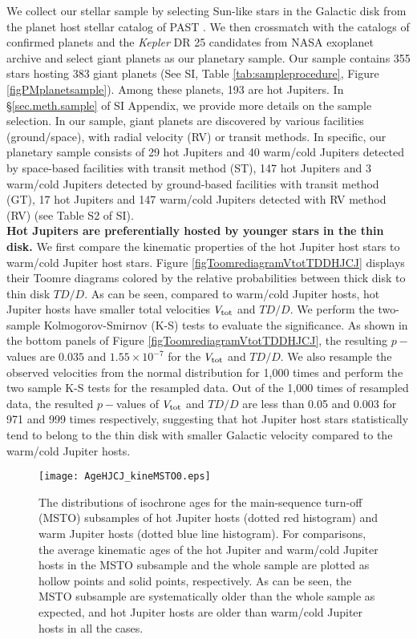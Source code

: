 \documentclass[twocolumn]{pnas-new}
\begin{document}
We collect our stellar sample by selecting Sun-like stars in the Galactic disk from the planet host stellar catalog of PAST \uppercase\expandafter{} \citep{2021ApJ...909..115C}.
We then crossmatch with the catalogs of confirmed planets and the {\it Kepler} DR 25 candidates from NASA exoplanet archive \citep[https://exoplanetarchive.ipac.caltech.edu;][]{2013PASP..125..989A} and select giant planets as our planetary sample.
Our sample contains 355 stars hosting 383 giant planets (See SI, Table \ref{tab:sampleprocedure}, Figure \ref{figPMplanetsample}).
Among these planets, 193 are hot Jupiters.
In \S \ref{sec.meth.sample} of SI Appendix, we provide more details on the sample selection.
In our sample, giant planets are discovered by various facilities (ground/space),  with radial velocity (RV) or transit methods. 
In specific, our planetary sample consists of 29 hot Jupiters and 40 warm/cold Jupiters detected by space-based facilities with transit method (ST), 147 hot Jupiters and 3 warm/cold Jupiters detected by ground-based facilities with transit method (GT), 17 hot Jupiters and 147 warm/cold Jupiters detected with RV method (RV) (see Table S2 of SI). \\





\noindent \textbf{Hot Jupiters are preferentially hosted by younger stars in the thin disk.} 
We first compare the kinematic properties of the hot Jupiter host stars to warm/cold Jupiter host stars.
Figure \ref{figToomrediagramVtotTDDHJCJ} displays their Toomre diagrams colored by the relative probabilities between thick disk to thin disk $TD/D$.
As can be seen, compared to warm/cold Jupiter hosts, hot Jupiter hosts have smaller total velocities $V_{\rm tot}$ and $TD/D$.
We perform the two-sample Kolmogorov-Smirnov (K-S) tests to evaluate the significance.
As shown in the bottom panels of Figure \ref{figToomrediagramVtotTDDHJCJ}, the resulting $p-$values are $0.035$ and $1.55 \times 10^{-7}$ for the $V_{\rm tot}$ and $TD/D$.
{We also resample the observed velocities from the normal distribution for 1,000 times and perform the two sample K-S tests for the resampled data.
Out of the 1,000 times of resampled data, the resulted $p-$values of $V_{\rm tot}$ and $TD/D$ are less than 0.05 and 0.003 for 971 and 999 times respectively, }
suggesting that hot Jupiter host stars statistically tend to belong to the thin disk with smaller Galactic velocity compared to the warm/cold Jupiter hosts. 

\begin{figure}[!t]
\centering
\texttt{[image: AgeHJCJ\_kineMSTO0.eps]}
\caption{The distributions of isochrone ages for the main-sequence turn-off (MSTO) subsamples of hot Jupiter hosts (dotted red histogram) and warm Jupiter hosts (dotted blue line histogram).
For comparisons, the average kinematic ages of the hot Jupiter and warm/cold Jupiter hosts in the MSTO subsample and the whole sample are plotted as hollow points and solid points, respectively.
As can be seen, the MSTO subsample are systematically older than the whole sample as expected, and hot Jupiter hosts are older than warm/cold Jupiter hosts in all the cases.
\label{figAgeHJCJ}}
\end{figure}
\end{document}
